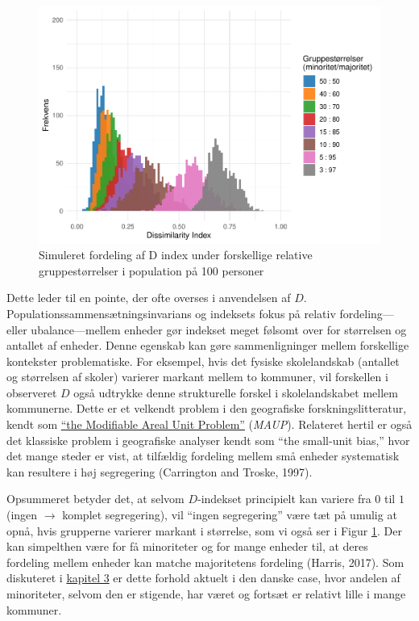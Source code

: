 \documentclass[
]{book}
\begin{document}
\begin{figure}
\includegraphics[width=1\linewidth]{en-befolkning-blander-sig_files/figure-latex/fig-9-1-1} \caption{Simuleret fordeling af D index under forskellige relative gruppestørrelser i population på 100 personer}\label{fig:fig-9-1}
\end{figure}

Dette leder til en pointe, der ofte overses i anvendelsen af \(D\). Populationssammensætningsinvarians og indeksets fokus på relativ fordeling---eller ubalance---mellem enheder gør indekset meget følsomt over for størrelsen og antallet af enheder. Denne egenskab kan gøre sammenligninger mellem forskellige kontekster problematiske. For eksempel, hvis det fysiske skolelandskab (antallet og størrelsen af skoler) varierer markant mellem to kommuner, vil forskellen i observeret \(D\) også udtrykke denne strukturelle forskel i skolelandskabet mellem kommunerne. Dette er et velkendt problem i den geografiske forskningslitteratur, kendt som \href{https://en.wikipedia.org/wiki/Modifiable_areal_unit_problem}{``the Modifiable Areal Unit Problem''} (\emph{MAUP}). Relateret hertil er også det klassiske problem i geografiske analyser kendt som ``the small-unit bias,'' hvor det mange steder er vist, at tilfældig fordeling mellem små enheder systematisk kan resultere i høj segregering (Carrington and Troske, 1997).

Opsummeret betyder det, at selvom \(D\)-indekset principielt kan variere fra \(0\) til \(1\) (ingen \(\rightarrow\) komplet segregering), vil ``ingen segregering'' være tæt på umulig at opnå, hvis grupperne varierer markant i størrelse, som vi også ser i Figur \ref{fig:fig-9-1}. Der kan simpelthen være for få minoriteter og for mange enheder til, at deres fordeling mellem enheder kan matche majoritetens fordeling (Harris, 2017). Som diskuteret i \hyperref[kap3]{kapitel 3} er dette forhold aktuelt i den danske case, hvor andelen af minoriteter, selvom den er stigende, har været og fortsæt er relativt lille i mange kommuner.
\end{document}
